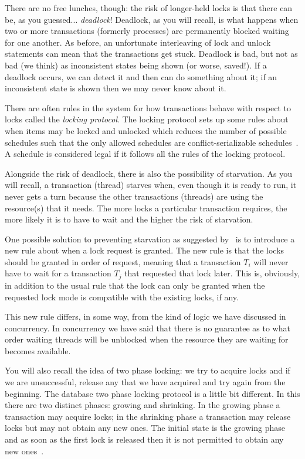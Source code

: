There are no free lunches, though: the risk of longer-held locks is that there can be, as you guessed... \textit{deadlock}! Deadlock, as you will recall, is what happens when two or more transactions (formerly processes) are permanently blocked waiting for one another. As before, an unfortunate interleaving of lock and unlock statements can mean that the transactions get stuck. Deadlock is bad, but not as bad (we think) as inconsistent states being shown (or worse, saved!). If a deadlock occurs, we can detect it and then can do something about it; if an inconsistent state is shown then we may never know about it.

There are often rules in the system for how transactions behave with respect to locks called the \textit{locking protocol}. The locking protocol sets up some rules about when items may be locked and unlocked which reduces the number of possible schedules such that the only allowed schedules are conflict-serializable schedules~\cite{dsc}. A schedule is considered legal if it follows all the rules of the locking protocol.

Alongside the risk of deadlock, there is also the possibility of starvation. As you will recall, a transaction (thread) starves when, even though it is ready to run, it never gets a turn because the other transactions (threads) are using the resource(s) that it needs. The more locks a particular transaction requires, the more likely it is to have to wait and the higher the risk of starvation.

One possible solution to preventing starvation as suggested by~\cite{dsc} is to introduce a new rule about when a lock request is granted. The new rule is that the locks should be granted in order of request, meaning that a transaction $T_{i}$ will never have to wait for a transaction $T_{j}$ that requested that lock later. This is, obviously, in addition to the usual rule that the lock can only be granted when the requested lock mode is compatible with the existing locks, if any.

This new rule differs, in some way, from the kind of logic we have discussed in concurrency. In concurrency we have said that there is no guarantee as to what order waiting threads will be unblocked when the resource they are waiting for becomes available.

You will also recall the idea of two phase locking: we try to acquire locks and if we are unsuccessful, release any that we have acquired and try again from the beginning. The database two phase locking protocol is a little bit different. In this there are two distinct phases: growing and shrinking. In the growing phase a transaction may acquire locks; in the shrinking phase a transaction may release locks but may not obtain any new ones. The initial state is the growing phase and as soon as the first lock is released then it is not permitted to obtain any new ones~\cite{dsc}.

